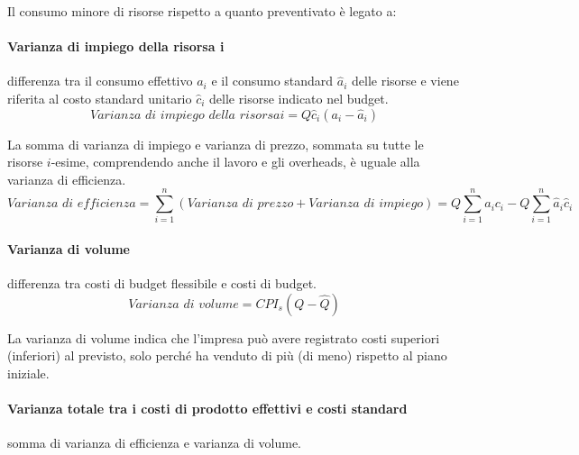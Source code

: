 Il consumo minore di risorse rispetto a quanto preventivato è legato a:

\paragraph{Varianza di impiego della risorsa i} differenza tra il consumo effettivo $a_i$ e il consumo standard $\hat{a}_i$ delle risorse e viene riferita al costo standard unitario $\hat{c}_i$ delle
risorse indicato nel budget.
\[
	\textit{Varianza di impiego della risorsa} i = Q \hat{c}_i \left(a_i - \hat{a}_i\right)
\]

La somma di varianza di impiego e varianza di prezzo, sommata su tutte le risorse $i$-esime, comprendendo anche il lavoro e gli overheads, è uguale alla varianza di efficienza.
\[
	\textit{Varianza di efficienza} = \sum^n_{i=1} \left(\textit{Varianza di prezzo} + \textit{Varianza di impiego}\right) = Q \sum^n_{i=1} a_i c_i - Q \sum^n_{i=1} \hat{a}_i \hat{c}_i
\]

\paragraph{Varianza di volume} differenza tra costi di budget flessibile e costi di budget.
\[
	\textit{Varianza di volume} = CPI_s \left(Q - \hat{Q}\right)
\]

La varianza di volume indica che l’impresa può avere registrato costi superiori (inferiori) al
previsto, solo perché ha venduto di più (di meno) rispetto al piano iniziale.

\paragraph{Varianza totale tra i costi di prodotto effettivi e costi standard} somma di varianza di efficienza e varianza di volume.